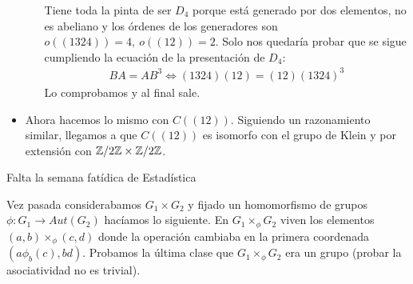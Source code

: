\begin{ej}
\begin{itemize}
\begin{itemize}
			Tiene toda la pinta de ser $D_4$ porque está generado por dos elementos, no es abeliano y los órdenes de los generadores son $o((1324)) = 4,\ o((12)) = 2$. Solo nos quedaría probar que se sigue cumpliendo la ecuación de la presentación de $D_4$:
			\begin{align*}
			BA = AB^3 \iff (1324)(12) = (12)(1324)^3
			\end{align*}
			Lo comprobamos y al final sale.
		\end{itemize}
		
		\item Ahora hacemos lo mismo con $C((12))$. Siguiendo un razonamiento similar, llegamos a que $C((12))$ es isomorfo con el grupo de Klein y por extensión con $\mathbb{Z}/2\mathbb{Z} \times \mathbb{Z}/2\mathbb{Z}$.
	\end{itemize}
\end{ej}


Falta la semana fatídica de Estadística

Vez pasada considerabamos $G_1 \times G_2$ y fijado un homomorfismo de grupos $\phi: G_1 \to Aut(G_2)$ hacíamos lo siguiente. En $G_1 \times_{\phi} G_2$ viven los elementos $(a,b) \times_{\phi} (c,d)$ donde la operación cambiaba en la primera coordenada $(a \phi_b(c), bd)$. Probamos la última clase que $G_1 \times_{\phi} G_2$ era un grupo (probar la asociatividad no es trivial).